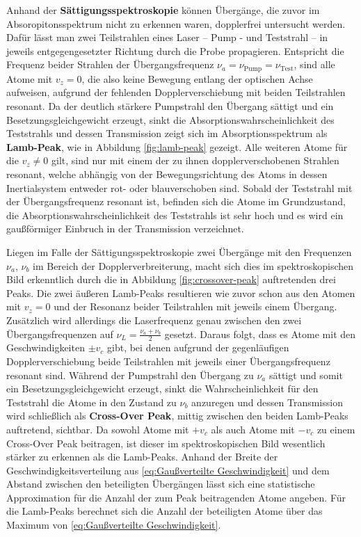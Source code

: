 \noindent Anhand der \textbf{Sättigungsspektroskopie} können Übergänge, die zuvor im Absoropitonsspektrum nicht zu erkennen waren, dopplerfrei untersucht werden. Dafür lässt man zwei Teilstrahlen eines Laser -- Pump
- und Teststrahl -- in jeweils entgegengesetzter Richtung durch die Probe propagieren. Entspricht die Frequenz beider Strahlen der Übergangsfrequenz $\nu_{a}=\nu_{\text{Pump}}=\nu_{\text{Test}}$, sind alle Atome mit  $v_{z}=0$, die also keine Bewegung entlang der optischen Achse aufweisen, aufgrund der fehlenden Dopplerverschiebung mit beiden Teilstrahlen resonant. Da der deutlich stärkere Pumpstrahl den Übergang sättigt und ein Besetzungsgleichgewicht erzeugt, sinkt die Absorptionswahrscheinlichkeit des Teststrahls und dessen Transmission zeigt sich im Absorptionsspektrum als \textbf{Lamb-Peak}, wie in Abbildung  \ref{fig:lamb-peak} gezeigt. Alle weiteren Atome für die $v_{z}\neq 0$ gilt, sind nur mit einem der zu ihnen dopplerverschobenen Strahlen resonant, welche abhängig von der Bewegungsrichtung des Atoms in dessen Inertialsystem entweder rot- oder blauverschoben sind. Sobald der Teststrahl mit der Übergangsfrequenz resonant ist, befinden sich die Atome im Grundzustand, die Absorptionswahrscheinlichkeit des Teststrahls ist sehr hoch und es wird ein gaußförmiger Einbruch in der Transmission verzeichnet. 

\noindent Liegen im Falle der Sättigungsspektroskopie zwei Übergänge mit den Frequenzen $\nu_{a}$, $\nu_{b}$ im Bereich der Dopplerverbreiterung, macht sich dies im spektroskopischen Bild erkenntlich durch die in Abbildung \ref{fig:crossover-peak} auftretenden drei Peaks. Die zwei äußeren Lamb-Peaks resultieren wie zuvor schon aus den Atomen mit $v_{z}=0$ und der Resonanz beider Teilstrahlen mit jeweils einem Übergang. Zusätzlich wird allerdings die Laserfrequenz genau zwischen den zwei Übergangsfrequenzen auf $\nu_{L}=\frac{\nu_{a}+\nu_{b}}{2}$ gesetzt. Daraus folgt, dass es Atome mit den Geschwindigkeiten $\pm v_{c}$ gibt, bei denen aufgrund der gegenläufigen Dopplerverschiebung beide Teilstrahlen mit jeweils einer Übergangsfrequenz resonant sind. Während der Pumpstrahl den Übergang zu $\nu_{a}$ sättigt und somit ein Besetzungsgleichgewicht erzeugt, sinkt die Wahrscheinlichkeit für den Teststrahl die Atome in den Zustand zu $\nu_{b}$ anzuregen und dessen Transmission wird schließlich als \textbf{Cross-Over Peak}, mittig zwischen den beiden Lamb-Peaks auftretend, sichtbar. Da sowohl Atome mit $+v_{c}$ als auch Atome mit $-v_{c}$ zu einem Cross-Over Peak beitragen, ist dieser im spektroskopischen Bild wesentlich stärker zu erkennen als die Lamb-Peaks. Anhand der Breite der Geschwindigkeitsverteilung aus \ref{eq:Gaußverteilte Geschwindigkeit} und dem Abstand zwischen den beteiligten Übergängen lässt sich eine statistische Approximation für die Anzahl der zum Peak beitragenden Atome angeben. Für die Lamb-Peaks berechnet sich die Anzahl der beteiligten Atome über das Maximum von \ref{eq:Gaußverteilte Geschwindigkeit}.\cite{H2}

